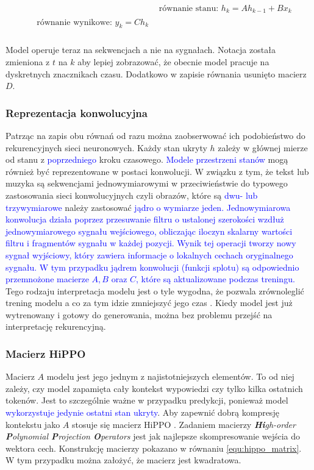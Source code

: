 \documentclass[data-science]{agh-wi} %
\begin{document}
\begin{align}
     & \text{równanie stanu: }h_k = Ah_{k-1} + Bx_k \label{equ:rownanie_stanu_seq} \\
    \begin{split}
        &\text{równanie wynikowe: }y_k = Ch_k \label{equ:rownanie_wynikowe_seq} \\
    \end{split}
\end{align}

Model operuje teraz na sekwencjach a nie na sygnałach. Notacja została zmieniona z $t$ na $k$ aby lepiej zobrazować, że obecnie model pracuje na dyskretnych znacznikach czasu. Dodatkowo w zapisie równania usunięto macierz $D$.

\subsubsection*{Reprezentacja konwolucyjna}
Patrząc na zapis obu równań od razu można zaobserwować ich podobieństwo do rekurencyjnych sieci neuronowych. Każdy stan ukryty $h$ zależy w głównej mierze od stanu z \textcolor{blue}{poprzedniego} kroku czasowego. \textcolor{blue}{Modele przestrzeni stanów} mogą również być reprezentowane w postaci konwolucji. W związku z tym, że tekst lub muzyka są sekwencjami jednowymiarowymi w przeciwieństwie do typowego zastosowania sieci konwolucyjnych czyli obrazów, które są \textcolor{blue}{dwu- lub trzywymiarowe} należy zastosować \textcolor{blue}{jądro o wymiarze jeden.  Jednowymiarowa konwolucja działa poprzez przesuwanie filtru o ustalonej szerokości wzdłuż jednowymiarowego sygnału wejściowego, obliczając iloczyn skalarny wartości filtru i fragmentów sygnału w każdej pozycji. Wynik tej operacji tworzy nowy sygnał wyjściowy, który zawiera informacje o lokalnych cechach oryginalnego sygnału. W tym przypadku jądrem konwolucji (funkcji splotu) są odpowiednio przemnożone macierze $A, B$ oraz $C$, które są aktualizowane podczas treningu.} Tego rodzaju interpretacja modelu jest o tyle wygodna, że pozwala zrównoleglić trening modelu a co za tym idzie zmniejszyć jego czas \cite{ssm_notacja}. Kiedy model jest już wytrenowany i gotowy do generowania, można bez problemu przejść na interpretację rekurencyjną.

\subsubsection*{Macierz HiPPO}
Macierz $A$ modelu jest jego jednym z najistotniejszych elementów. To od niej zależy, czy model zapamięta cały kontekst wypowiedzi czy tylko kilka ostatnich tokenów. Jest to szczególnie ważne w przypadku predykcji, ponieważ model \textcolor{blue}{wykorzystuje jedynie ostatni stan ukryty}. Aby zapewnić dobrą kompresję kontekstu jako $A$ stosuje się macierz HiPPO \cite{hippo}. Zadaniem macierzy \textit{\textbf{Hi}gh-order \textbf{P}olynomial \textbf{P}rojection \textbf{O}perators} jest jak najlepsze skompresowanie wejścia do wektora cech. Konstrukcję macierzy pokazano w równaniu \ref*{equ:hippo_matrix}. W tym przypadku można założyć, że macierz jest kwadratowa.
\end{document}
